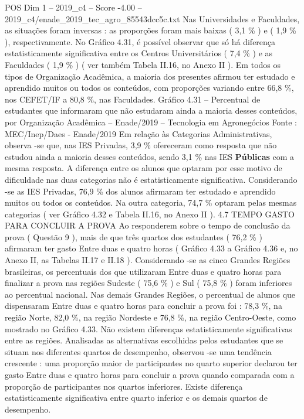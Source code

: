 \begin{textsample}{POS Dim 1 – 2019\_c4 – Score -4.00 – 2019\_c4/enade\_2019\_tec\_agro\_85543dcc5c.txt}
Nas Universidades e Faculdades, as situações foram inversas : as proporções foram mais baixas ( 3,1 \% ) e ( 1,9 \% ), respectivamente.
No Gráfico 4.31, é possível observar que só há diferença estatisticamente significativa entre os Centros Universitários ( 7,4 \% ) e as Faculdades ( 1,9 \% ) ( ver também Tabela II.16, no Anexo II ).
Em todos os tipos de Organização Acadêmica, a maioria dos presentes afirmou ter estudado e aprendido muitos ou todos os conteúdos, com proporções variando entre 66,8 \%, nos CEFET/IF a 80,8 \%, nas Faculdades.
Gráfico 4.31 – Percentual de estudantes que informaram que não estudaram ainda a maioria desses conteúdos, por Organização Acadêmica – Enade/2019 – Tecnologia em Agronegócios Fonte : MEC/Inep/Daes - Enade/2019 Em relação às Categorias Administrativas, observa -se que, nas IES Privadas, 3,9 \% ofereceram como resposta que não estudou ainda a maioria desses conteúdos, sendo 3,1 \% nas IES \textbf{Públicas} com a mesma resposta.
A diferença entre os alunos que optaram por esse motivo de dificuldade nas duas categorias não é estatisticamente significativa.
Considerando -se as IES Privadas, 76,9 \% dos alunos afirmaram ter estudado e aprendido muitos ou todos os conteúdos.
Na outra categoria, 74,7 \% optaram pelas mesmas categorias ( ver Gráfico 4.32 e Tabela II.16, no Anexo II ). 4.7 TEMPO GASTO PARA CONCLUIR A PROVA Ao responderem sobre o tempo de conclusão da prova ( Questão 9 ), mais de que três quartos dos estudantes ( 76,2 \% ) afirmaram ter gasto Entre duas e quatro horas ( Gráfico 4.33 a Gráfico 4.36 e, no Anexo II, as Tabelas II.17 e II.18 ).
Considerando -se as cinco Grandes Regiões brasileiras, os percentuais dos que utilizaram Entre duas e quatro horas para finalizar a prova nas regiões Sudeste ( 75,6 \% ) e Sul ( 75,8 \% ) foram inferiores ao percentual nacional.
Nas demais Grandes Regiões, o percentual de alunos que dispensaram Entre duas e quatro horas para concluir a prova foi : 78,3 \%, na região Norte, 82,0 \%, na região Nordeste e 76,8 \%, na região Centro-Oeste, como mostrado no Gráfico 4.33.
Não existem diferenças estatisticamente significativas entre as regiões.
Analisadas as alternativas escolhidas pelos estudantes que se situam nos diferentes quartos de desempenho, observou -se uma tendência crescente : uma proporção maior de participantes no quarto superior declarou ter gasto Entre duas e quatro horas para concluir a prova quando comparada com a proporção de participantes nos quartos inferiores.
Existe diferença estatisticamente significativa entre quarto inferior e os demais quartos de desempenho.

\end{textsample}
